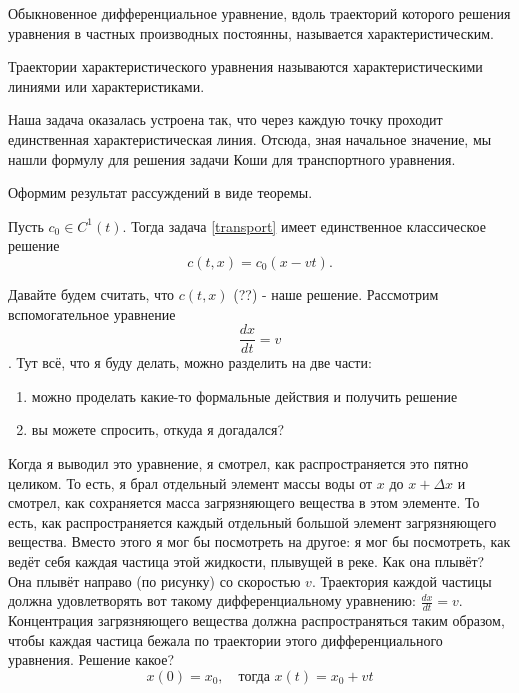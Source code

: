 \begin{definition} Обыкновенное дифференциальное уравнение, вдоль траекторий которого решения уравнения в частных производных постоянны, называется характеристическим.
\end{definition}

\begin{definition} Траектории характеристического уравнения называются характеристическими линиями или характеристиками.
\end{definition}

Наша задача оказалась устроена так, что через каждую точку проходит единственная характеристическая линия. Отсюда, зная начальное значение, мы нашли формулу для решения задачи Коши для транспортного уравнения.

Оформим результат рассуждений в виде теоремы.

\begin{theorem}
Пусть $c_0 \in C^1(t)$. Тогда задача \eqref{transport} имеет единственное классическое решение $$ c (t,x) = c_0 (x - v t) .$$
\end{theorem}


\pagebreak

Давайте будем считать, что $ c(t, x) $ (??) - наше решение. Рассмотрим вспомогательное уравнение $$ \frac {dx} {dt} = v $$. Тут всё, что я буду делать, можно разделить на две части:
\begin{enumerate}
\item можно проделать какие-то формальные действия и получить решение
\item вы можете спросить, откуда я догадался?
\end{enumerate}

Когда я выводил это уравнение, я смотрел, как распространяется это пятно целиком. То есть, я брал отдельный элемент массы воды от $x$ до $ x + \Delta x $ и смотрел, как сохраняется масса загрязняющего вещества в этом элементе. То есть, как распространяется каждый отдельный большой элемент загрязняющего вещества. Вместо этого я мог бы посмотреть на другое: я мог бы посмотреть, как ведёт себя каждая частица этой жидкости, плывущей в реке. Как она плывёт? Она плывёт направо (по рисунку) со скоростью $v$. Траектория каждой частицы должна удовлетворять вот такому дифференциальному уравнению: $ \displaystyle \frac {dx} {dt} = v $. Концентрация загрязняющего вещества должна распространяться таким образом, чтобы каждая частица бежала по траектории этого дифференциального уравнения.
Решение какое?
$$ x(0) = x_0,\quad \text{тогда }x(t) = x_0 + v t $$

